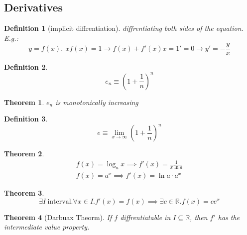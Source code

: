 \documentclass[]{article}
\newtheorem{theorem}{Theorem}[section]
\newtheorem{definition}{Definition}[section]
\newcommand\R     {\mathbb{R}}
\newcommand\limi  {\lim_{x \to \infty}}
\newcommand\cl [1]    {\left ( #1 \right )}
\begin{document}
\begin{multicols}{2}
		\section{Derivatives}
		\begin{definition}[implicit diffrentiation]
			diffrentiating both sides of the equation. E.g.: 
			\[ y = f(x), \ xf(x) = 1 \to f(x) + f'(x)x = 1' = 0 \to y' = -\frac{y}{x} \]
		\end{definition}
		\begin{definition}
			\[ e_n \equiv \cl{1 + \frac{1}{n}}^n \]
		\end{definition}
		\begin{theorem}
			$e_n$ is monotonically increasing
		\end{theorem}
		\begin{definition}
			\[ e \equiv \limi \cl{1 + \frac{1}{n}}^{n} \]
		\end{definition}
		\begin{theorem}
			\begin{gather*}
				f(x) = \log_ax \implies f'(x) = \frac{1}{x\ln a} \\
				f(x) = a^x \implies f'(x) = \ln a \cdot a^{x}
			\end{gather*}
		\end{theorem}
		\begin{theorem}
			\[ \exists I \ \mathrm{interval}. \forall x \in I. f'(x) = f(x) \implies \exists c \in \R. f(x) = ce^x \]
		\end{theorem}
		\begin{theorem}[Darbuax Theorm]
			If $f$ diffrentiatable in $I \subseteq \R$, then $f'$ has the intermediate value property. 
		\end{theorem}

\end{multicols}
\end{document}
